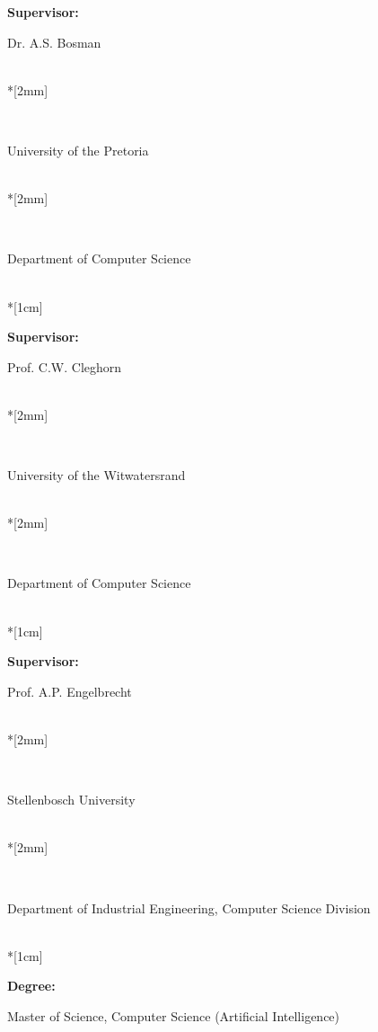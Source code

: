 \pagestyle{empty}
\vspace*{\fill}
\noindent
\parbox{4cm}{\textbf{Supervisor:}}\parbox{12cm}{Dr. A.S. Bosman}\\*[2mm]
\parbox{4cm}{\textbf{~}}\parbox{12cm}{University of the Pretoria}\\*[2mm]
\parbox{4cm}{\textbf{~}}\parbox{12cm}{Department of Computer Science}\\*[1cm]
\parbox{4cm}{\textbf{Supervisor:}}\parbox{12cm}{Prof. C.W. Cleghorn}\\*[2mm]
\parbox{4cm}{\textbf{~}}\parbox{12cm}{University of the Witwatersrand}\\*[2mm]
\parbox{4cm}{\textbf{~}}\parbox{12cm}{Department of Computer Science}\\*[1cm]
\parbox{4cm}{\textbf{Supervisor:}}\parbox{12cm}{Prof. A.P. Engelbrecht}\\*[2mm]
\parbox{4cm}{\textbf{~}}\parbox{12cm}{Stellenbosch University}\\*[2mm]
\parbox{4cm}{\textbf{~}}\parbox{12cm}{Department of Industrial Engineering, Computer Science Division}\\*[1cm]
\parbox{4cm}{\textbf{Degree:}}\parbox{12cm}{Master of Science, Computer Science (Artificial Intelligence)}
\newpage
